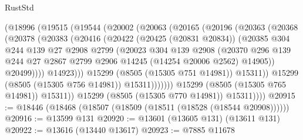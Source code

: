 \begin{lexlean}{RustStd}
\begin{coremodule}
                    (@18996
                      (@19515
                        (@19544
                          (@20002
                            (@20063
                              (@20165
                                (@20196
                                  (@20363
                                    (@20368
                                      (@20378
                                        (@20383
                                          (@20416
                                            (@20422
                                              (@20425 (@20831 @20834))
                                              (@20385
                                                @304
                                                @244
                                                @139
                                                @27
                                                @2908
                                                @2799
                                                (@20023
                                                  @304
                                                  @139
                                                  @2908
                                                  (@20370
                                                    @296
                                                    @139
                                                    @244
                                                    @27
                                                    @2867
                                                    @2799
                                                    @2906
                                                    @14245
                                                    (@14254 @20006 @2562)
                                                    @14905))
                                                @20499))))
                                        @14923)))
                                  @15299
                                  (@8505 (@15305 @751 @14981))
                                  @15311))
                              @15299
                              (@8505 (@15305 @756 @14981))
                              @15311)))))))
                @15299
                (@8505 (@15305 @765 @14981))
                @15311))
            @15299
            (@8505 (@15305 @770 @14981))
            @15311))))
@20915 := @18446 (@18468 (@18507 (@18509 (@18511 (@18528 (@18544 @20908))))))
@20916 := @13599 @131
@20920 := @13601 (@13605 @131) (@13611 @131)
@20922 := @13616 (@13440 @13617)
@20923 := @7885 @11678

\end{coremodule}
\end{lexlean}
